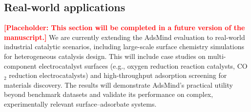
\subsection{Real-world applications}
\label{subsec:real-world-apps}

\textcolor{red}{\textbf{[Placeholder: This section will be completed in a future version of the manuscript.]}}
We are currently extending the AdsMind evaluation to real-world industrial catalytic scenarios, including large-scale surface chemistry simulations for heterogeneous catalysis design.
This will include case studies on multi-component electrocatalyst surfaces (e.g., oxygen reduction reaction catalysts, CO$_2$ reduction electrocatalysts) and high-throughput adsorption screening for materials discovery.
The results will demonstrate AdsMind's practical utility beyond benchmark datasets and validate its performance on complex, experimentally relevant surface--adsorbate systems.
